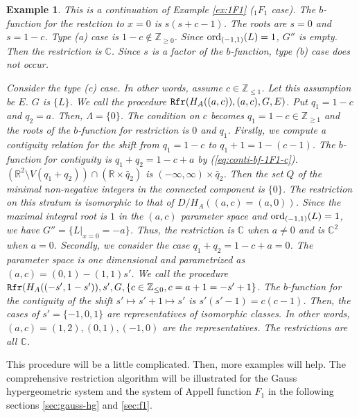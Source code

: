 \documentclass{article}
\def\CC{\mathbb{C}}
\def\RR{\mathbb{R}}
\def\ZZ{\mathbb{Z}}
\newtheorem{example}{Example}
\begin{document}
\begin{example}\rm \label{ex:1F1-restriction}
This is a continuation of Example \ref{ex:1F1} (${}_1 F_1$ case).
The $b$-function for the restction to $x=0$
is $s(s+c-1)$.
The roots are $s=0$ and $s=1-c$.
Type (a) case is $1-c \not\in \ZZ_{\geq 0}$.
Since ${\rm ord}_{(-1,1)}(L)=1$, $G''$ is empty.
Then the restriction is $\CC$.
Since $s$ is a factor of the $b$-function, type (b) case does not occur.


Consider the type (c) case.
In other words, assume $c \in \ZZ_{\leq 1}$.
Let this assumption be $E$.
$G$ is $\{ L \}$.
We call the procedure 
$\mbox{\tt Rfr}(H_A((a,c)), (a,c), G, E)$.
Put $q_1=1-c$ and $q_2=a$.
Then, $\Lambda=\{ 0 \}$.
The condition on $c$ becomes $q_1=1-c \in \ZZ_{\geq 1}$
and the roots of the $b$-function for restriction is $0$ and $q_1$.
Firstly, we compute 
a contiguity relation for the shift from $q_1=1-c$ to $q_1+1=1-(c-1)$.
The $b$-function for contiguity is $q_1+q_2=1-c+a$
by (\ref{eq:conti-bf-1F1-c}).
$\left( \RR^2 \setminus V(q_1+q_2) \right) \cap \left( \RR \times {\bar q}_2 \right)$ 
is $ (-\infty,\infty) \times {\bar q}_2$.
Then the set $Q$ of the minimal non-negative integers in the connected component is $\{ 0 \}$.
The restriction on this stratum is isomorphic to that of $D/H_A((a,c)=(a,0))$.
Since the maximal integral root is $1$ in the $(a,c)$ parameter space
and ${\rm ord}_{(-1,1)}(L)=1$,
we have $G''=\{ L|_{x=0}= -a \}$.
Thus, the restriction is $\CC$ when $a \not= 0$
and is $\CC^2$ when $a=0$.
Secondly, we consider the case $q_1+q_2 = 1-c+a=0$.
The parameter space is one dimensional and parametrized as
$(a,c)=(0,1)-(1,1)s'$.
We call the procedure
$\mbox{\tt Rfr}(H_A((-s',1-s')), s', G, \{ c \in \ZZ_{\leq 0}, c=a+1=-s'+1 \}$.
The $b$-function for the contiguity
of the shift $s' \mapsto s'+1 \mapsto s'$ 
is $s'(s'-1)=c(c-1)$.
Then, the cases of $s'=\{ -1,0,1 \}$ are representatives
of isomorphic classes.
In other words, $(a,c)=(1,2), (0,1), (-1,0)$ are the representatives. 
The restrictions are all $\CC$. 
\end{example}


This procedure will be a little complicated.
Then, more examples will help.
The comprehensive restriction algorithm will be illustrated for
the Gauss hypergeometric system and the system of Appell function 
$F_1$ 
in the following sections \ref{sec:gauss-hg} and \ref{sec:f1}. 
\end{document}
